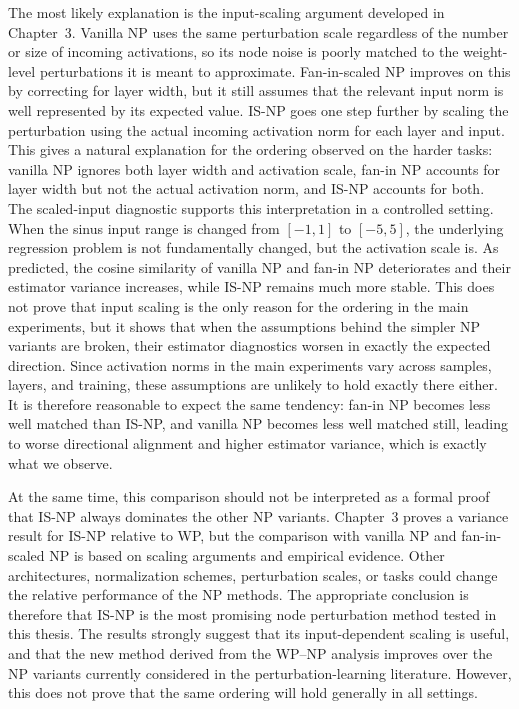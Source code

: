 The most likely explanation is the input-scaling argument developed in Chapter~3. Vanilla NP uses the same perturbation scale regardless of the number or size of incoming activations, so its node noise is poorly matched to the weight-level perturbations it is meant to approximate. Fan-in-scaled NP improves on this by correcting for layer width, but it still assumes that the relevant input norm is well represented by its expected value. IS-NP goes one step further by scaling the perturbation using the actual incoming activation norm for each layer and input. This gives a natural explanation for the ordering observed on the harder tasks: vanilla NP ignores both layer width and activation scale, fan-in NP accounts for layer width but not the actual activation norm, and IS-NP accounts for both. The scaled-input diagnostic supports this interpretation in a controlled setting. When the sinus input range is changed from \([-1,1]\) to \([-5,5]\), the underlying regression problem is not fundamentally changed, but the activation scale is. As predicted, the cosine similarity of vanilla NP and fan-in NP deteriorates and their estimator variance increases, while IS-NP remains much more stable. This does not prove that input scaling is the only reason for the ordering in the main experiments, but it shows that when the assumptions behind the simpler NP variants are broken, their estimator diagnostics worsen in exactly the expected direction. Since activation norms in the main experiments vary across samples, layers, and training, these assumptions are unlikely to hold exactly there either. It is therefore reasonable to expect the same tendency: fan-in NP becomes less well matched than IS-NP, and vanilla NP becomes less well matched still, leading to worse directional alignment and higher estimator variance, which is exactly what we observe.

At the same time, this comparison should not be interpreted as a formal proof that IS-NP always dominates the other NP variants. Chapter~3 proves a variance result for IS-NP relative to WP, but the comparison with vanilla NP and fan-in-scaled NP is based on scaling arguments and empirical evidence. Other architectures, normalization schemes, perturbation scales, or tasks could change the relative performance of the NP methods. The appropriate conclusion is therefore that IS-NP is the most promising node perturbation method tested in this thesis. The results strongly suggest that its input-dependent scaling is useful, and that the new method derived from the WP--NP analysis improves over the NP variants currently considered in the perturbation-learning literature. However, this does not prove that the same ordering will hold generally in all settings.

